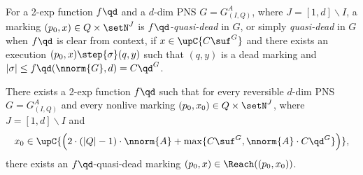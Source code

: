 \begin{defi}
\hfill\\	
	For a 2-exp function $f\qd$ and a $d$-dim PNS $G=G^A_{(I,Q)}$,
	where $J=[1,d]\smallsetminus I$,
	a marking $(p_0,x)\in Q\times \setN^J$
	is \emph{$f\qd$-quasi-dead} in $G$, or simply
	\emph{quasi-dead} in $G$ when $f\qd$
	is clear from context, if $x\in\upC{C\suf^G}$ 
	and there exists an execution $(p_0,x)\step{\sigma}(q,y)$ such
	that $(q,y)$ is a dead
marking and $|\sigma|\leq
f\qd(\nnorm{G},d)=C\qd^G$.
\end{defi}

\begin{lem}\label{lem:reachquasiPNS}
	There exists a 2-exp function
	$f\qd$ such that 
	for every reversible $d$-dim PNS $G=G^A_{(I,Q)}$ and 
	every nonlive marking $(p_0,x_0)\in Q\times \setN^J$, where
	$J=[1,d]\smallsetminus I$ and
	\begin{equation}\label{eq:condxzero}
x_0\in\upC{\left(2\cdot(|Q|-1)\cdot\nnorm{A}+
		\max\{C\suf^G,\nnorm{A}\cdot C\qd^G\}\right)},
	\end{equation}
		there exists an $f\qd$-quasi-dead marking
	$(p_0,x)\in\Reach((p_0,x_0))$.
\end{lem}
